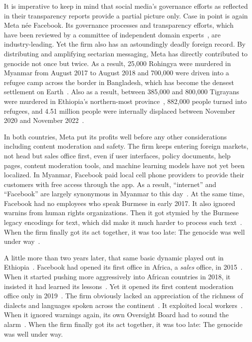 It is imperative to keep in mind that social media's governance efforts as
reflected in their transparency reports provide a partial picture only. Case in
point is again Meta n\'ee Facebook. Its governance processes and transparency
efforts, which have been reviewed by a committee of independent domain
experts~\cite{BradfordGriselea2019}, are industry-leading. Yet the firm also has
an astoundingly deadly foreign record. By distributing and amplifying sectarian
messaging, Meta has directly contributed to genocide not once but twice. As a
result, 25,000 Rohingya were murdered in Myanmar from August 2017 to August 2018
and 700,000 were driven into a refugee camp across the border in Bangladesh,
which has become the densest settlement on
Earth~\cite{DeGuzman2022,HumanRightsCouncil2018}. Also as a result, between
385,000 and 800,000 Tigrayans were murdered in Ethiopia's northern-most
province~\cite{AnnysVandenBemptea2021,ChothiaBekit2022}, 882,000 people turned
into refugees, and 4.51 million people were internally displaced between
November 2020 and November 2022~\cite{UNICEF2023}.

In both countries, Meta put its profits well before any other considerations
including content moderation and safety. The firm keeps entering foreign
markets, not head but sales office first, even if user interfaces, policy
documents, help pages, content moderation tools, and machine learning models
have not yet been localized. In Myanmar, Facebook paid local cell phone
providers to provide their customers with free access through the app. As a
result, ``internet'' and ``Facebook'' are largely synonymous in Myanmar to this
day~\cite{Strom2016}. At the same time, Facebook had no employees who speak
Burmese in early 2017. It also ignored warnins from human rights organizations.
Then it got stymied by the Burmese legacy encodings for text, which did make it
much harder to process such text~\cite{LaGrowPruzan2019,Wade2022}. When the firm
finally got its act together, it was too late: The genocide was well under
way~\cite{McLaughlin2018,MilkoOrtutay2022,Mozur2018,Ortutay2022}.

A little more than two years later, that same basic dynamic played out in
Ethiopia~\cite{Allen2022,Gilbert2020,GlobalWitness2022,Ilori2020,Malik2022,ElliottChristopherea2021,ZelalemGuest2021,RobinsEarly2021}.
Facebook had opened its first office in Africa, a \emph{sales} office, in
2015~\cite{Wagner2015}. When it started pushing more aggressively into African
countries in 2018, it insisted it had learned its lessons~\cite{Tiku2018}. Yet
it opened its first content moderation office only in 2019~\cite{Agutu2019}. The
firm obviously lacked an appreciation of the richness of dialects and languages
spoken across the
continent~\cite{FickDave2019,JacksonTownsendea2022,Madung2021}. It exploited
local workers~\cite{AlSibai2022,Perrigo2022,Perrigo2023}. When it ignored
warnings again, its own Oversight Board had to sound the alarm~\cite{Faife2021}.
When the firm finally got its act together, it was too late: The genocide was
well under way.

